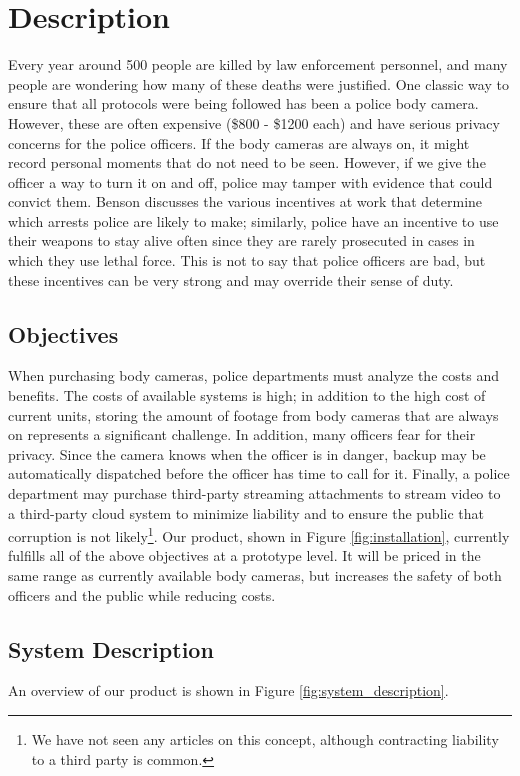 \documentclass[12pt]{article}
\begin{document}
\section{Description}
Every year around 500 people are killed by law enforcement personnel, and many
people are wondering how many of these deaths were justified. One classic way
to ensure that all protocols were being followed has been a police body camera.
However, these are often expensive (\$800 - \$1200 each\cite{cam}) and have
serious privacy concerns for the police officers. If the body cameras are
always on, it might record personal moments that do not need to be seen.
However, if we give the officer a way to turn it on and off, police may tamper
with evidence that could convict them. Benson discusses the various incentives
at work that determine which arrests police are likely to
make\cite[ch.~6]{enterprise_of_law}; similarly, police have an incentive to use
their weapons to stay alive often since they are rarely prosecuted in cases in
which they use lethal force\cite{no_conviction_1,no_conviction_2}. This is not
to say that police officers are bad, but these incentives can be very strong
and may override their sense of duty.

\subsection{Objectives}
When purchasing body cameras, police departments must analyze the costs and
benefits.  The costs of available systems is high; in addition to the high cost
of current units\cite{cam}, storing the amount of footage from body cameras
that are always on represents a significant challenge\cite{store1,store2}. In
addition, many officers fear for their privacy\cite{officer_privacy}. Since the
camera knows when the officer is in danger, backup may be automatically
dispatched before the officer has time to call for it. Finally, a police
department may purchase third-party streaming attachments to stream video to a
third-party cloud system to minimize liability and to ensure the public that
corruption is not likely\footnote{We have not seen any articles on this
concept, although contracting liability to a third party is common.}.  Our
product, shown in Figure \ref{fig:installation}, currently fulfills all of the
above objectives at a prototype level.  It will be priced in the same range as
currently available body cameras, but increases the safety of both officers and
the public while reducing costs.

\subsection{System Description}
An overview of our product is shown in Figure \ref{fig:system_description}.
\end{document}
